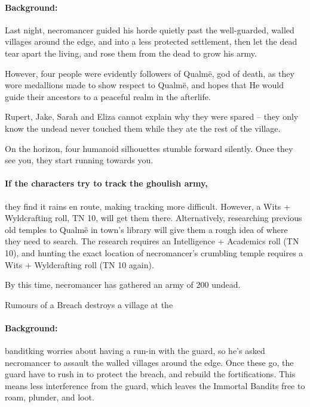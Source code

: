 \begin{multicols}{2}
\paragraph{Background:}
Last night, \gls{necromancer} guided his horde quietly past the well-guarded, walled villages around the \gls{edge}, and into a less protected settlement, then let the dead tear apart the living, and rose them from the dead to grow his army.

However, four people were evidently followers of Qualm\"{e}, god of death, as they wore medallions made to show respect to Qualm\"{e}, and hopes that He would guide their ancestors to a peaceful realm in the afterlife.

Rupert, Jake, Sarah and Eliza cannot explain why they were spared -- they only know the undead never touched them while they ate the rest of the village.

\begin{boxtext}

  On the horizon, four humanoid silhouettes stumble forward silently.  Once they see you, they start running towards you.

\end{boxtext}

\paragraph{If the characters try to track the ghoulish army,}
they find it rains en route, making tracking more difficult.
However, a Wits + Wyldcrafting roll, TN 10, will get them there.
Alternatively, researching previous old temples to Qualm\"{e} in \gls{town}'s library will give them a rough idea of where they need to search.
The research requires an Intelligence + Academics roll (TN 10), and hunting the exact location of \gls{necromancer}'s crumbling temple requires a Wits + Wyldcrafting roll (TN 10 again).

By this time, \gls{necromancer} has gathered an army of 200 undead.

{\squash Rumours of a Breach}%
{ destroys a village at the }%

\paragraph{Background:}
\Gls{banditking} worries about having a run-in with the \gls{guard}, so he's asked \gls{necromancer} to assault the walled villages around the \gls{edge}.
Once these go, the \gls{guard} have to rush in to protect the breach, and rebuild the fortifications.
This means less interference from the \gls{guard}, which leaves the Immortal Bandits free to roam, plunder, and loot.


\end{multicols}
